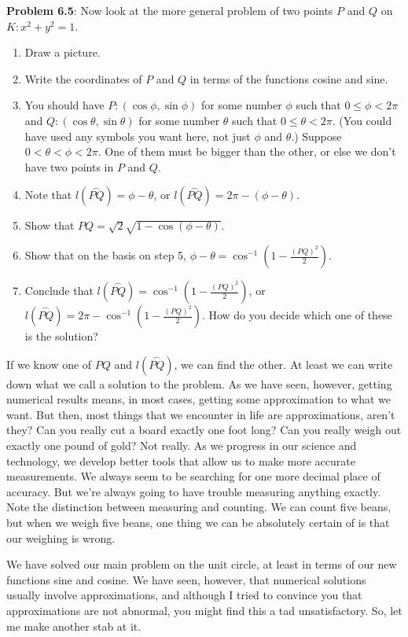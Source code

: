 \documentclass[english]{book}
\newcommand{\arc}[1]{\overset{\frown}{#1} }
\begin{document}
\textbf{Problem 6.5}: Now look at the more general problem of two points $P$ and $Q$ on $K: x^{2}+y^{2} = 1$.
\begin{enumerate}[\hspace{1cm}1)]
  \item Draw a picture.
  \item Write the coordinates of $P$ and $Q$ in terms of the functions cosine and sine.
  \item You should have $P:(\cos \phi, \sin \phi)$ for some number $\phi$ such that $0 \leq \phi < 2\pi$ and $Q:(\cos \theta, \sin \theta)$ for some number $\theta$ such that $0 \leq \theta < 2\pi$. (You could have used any symbols you want here, not just $\phi$ and $\theta$.) Suppose $0 < \theta < \phi < 2\pi$. One of them must be bigger than the other, or else we don't have two points in $P$ and $Q$.
  \item Note that $l(\arc{PQ}) = \phi - \theta$, or $l(\arc{PQ}) = 2\pi - (\phi - \theta)$.
  \item Show that $PQ = \sqrt{2} \sqrt{1 - \cos (\phi - \theta)}$.
  \item Show that on the basis on step 5, $\phi - \theta = \cos^{-1} (1- \frac{(PQ)^{2}}{2})$.
  \item Conclude that $l(\arc{PQ}) = \cos^{-1} (1- \frac{(PQ)^{2}}{2})$, or $l(\arc{PQ}) = 2\pi - \cos^{-1} (1- \frac{(PQ)^{2}}{2})$. How do you decide which one of these is the solution?
\end{enumerate}

If we know one of $PQ$ and $l(\arc{PQ})$, we can find the other. At least we can write down what we call a solution to the problem. As we have seen, however, getting numerical results means, in most cases, getting some approximation to what we want. But then, most things that we encounter in life are approximations, aren't they? Can you really cut a board exactly one foot long? Can you really weigh out exactly one pound of gold? Not really. As we progress in our science and technology, we develop better tools that allow us to make more accurate measurements. We always seem to be searching for one more decimal place of accuracy. But we're always going to have trouble measuring anything exactly. Note the distinction between measuring and counting. We can count five beans, but when we weigh five beans, one thing we can be absolutely certain of is that our weighing is wrong.

We have solved our main problem on the unit circle, at least in terms of our new functions sine and cosine. We have seen, however, that numerical solutions usually involve approximations, and although I tried to convince you that approximations are not abnormal, you might find this a tad unsatisfactory. So, let me make another stab at it. 
\end{document}
